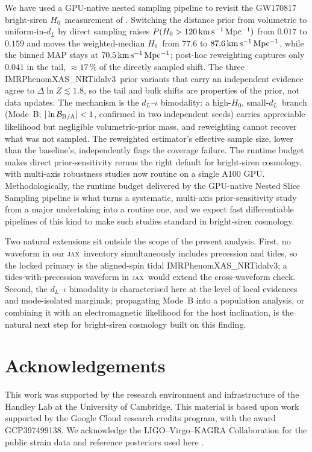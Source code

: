 \documentclass[usenatbib]{mnras}
\newcommand{\kmsmpc}{\ensuremath{\,\rm km\,s^{-1}\,Mpc^{-1}}\xspace}
\newcommand{\hzero}{\ensuremath{H_{0}}\xspace}
\newcommand{\dL}{\ensuremath{d_{L}}\xspace}
\newcommand{\IMRX}{IMRPhenomXAS\_NRTidalv3\xspace}
\newcommand{\jax}{\textsc{jax}\xspace}
\begin{document}
We have used a GPU-native nested sampling pipeline to revisit the GW170817 bright-siren \hzero\ measurement of \citet{Abbott2017H0}. Switching the distance prior from volumetric to uniform-in-$d_L$ by direct sampling raises $P(\hzero>120\kmsmpc)$ from $0.017$ to $0.159$ and moves the weighted-median \hzero\ from $77.6$ to $87.6\kmsmpc$, while the binned MAP stays at $70.5\kmsmpc$; post-hoc reweighting captures only $0.041$ in the tail, $\approx 17\,\%$ of the directly sampled shift. The three \IMRX\ prior variants that carry an independent evidence agree to $\Delta\ln Z\lesssim 1.8$, so the tail and bulk shifts are properties of the prior, not data updates. The mechanism is the $\dL$--$\iota$ bimodality: a high-\hzero, small-\dL\ branch (Mode~B; $|\ln\mathcal{B}_{\rm B/A}|<1$, confirmed in two independent seeds) carries appreciable likelihood but negligible volumetric-prior mass, and reweighting cannot recover what was not sampled. The reweighted estimator's effective sample size, lower than the baseline's, independently flags the coverage failure. The runtime budget makes direct prior-sensitivity reruns the right default for bright-siren cosmology, with multi-axis robustness studies now routine on a single A100 GPU. Methodologically, the runtime budget delivered by the GPU-native Nested Slice Sampling pipeline is what turns a systematic, multi-axis prior-sensitivity study from a major undertaking into a routine one, and we expect fast differentiable pipelines of this kind to make such studies standard in bright-siren cosmology.

Two natural extensions sit outside the scope of the present analysis. First, no waveform in our \jax\ inventory simultaneously includes precession and tides, so the locked primary is the aligned-spin tidal \IMRX; a tides-with-precession waveform in \jax\ would extend the cross-waveform check. Second, the $\dL$--$\iota$ bimodality is characterised here at the level of local evidences and mode-isolated marginals; propagating Mode~B into a population analysis, or combining it with an electromagnetic likelihood for the host inclination, is the natural next step for bright-siren cosmology built on this finding.

\section*{Acknowledgements}

This work was supported by the research environment and infrastructure of the Handley Lab at the University of Cambridge. This material is based upon work supported by the Google Cloud research credits program, with the award GCP397499138. We acknowledge the LIGO--Virgo--KAGRA Collaboration for the public strain data and reference posteriors used here \citep{Abbott2019GWTC1,Abbott2021GWTC2p1,LVK_GW170817_DataRelease,LVK_H0_DataRelease,GWTC2p1_GW150914_Zenodo}.
\end{document}
